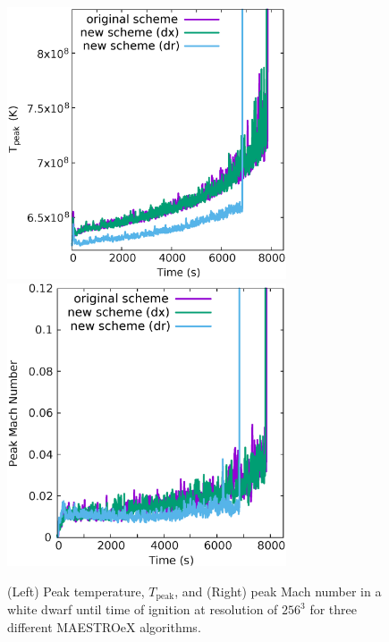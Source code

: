 \begin{figure}[htb]
\begin{center}
\includegraphics[width=3.25in]{./figs/wdconvect_256_maxT}  \hspace{0.5in}
\includegraphics[width=3.25in]{./figs/wdconvect_256_maxMach}
\caption{\label{fig:wdconvect_256_maxvar} (Left) Peak temperature, $T_{\text{peak}}$, and (Right) peak Mach number
         in a white dwarf until time of ignition at resolution of $256^3$ for three different MAESTROeX algorithms.}
\end{center}
\end{figure}

